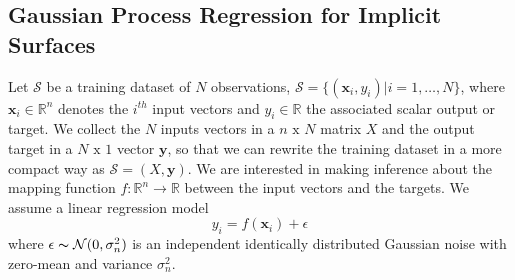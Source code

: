 %
%
%
%

\subsection{Gaussian Process Regression for Implicit Surfaces}
\label{sec:gpr}

Let $\mathcal{S}$ be a training dataset of $N$ observations, $\mathcal{S}=\{(\mathbf{x}_i, y_i)|i=1,\dots,N\}$, where $\mathbf{x}_i\in\mathbb{R}^n$ denotes the $i^{th}$ input vectors and $y_i\in\mathbb{R}$ the associated scalar output or target.  We collect the $N$ inputs vectors in a $n\text{ x }N$ matrix $X$ and the output target in a $N\text{ x }1$ vector $\mathbf{y}$, so that we can rewrite the training dataset in a more compact way as $\mathcal{S}=(X,\mathbf{y})$. We are interested in making inference about the mapping function $f:\mathbb{R}^n\rightarrow\mathbb{R}$ between the input vectors and the targets. We assume a linear regression model
$$
y_i=f(\mathbf{x}_i)+\epsilon
$$
where $\epsilon\thicksim\mathcal{N}(0,\sigma_n^2)$ is an independent identically distributed Gaussian noise with zero-mean and variance $\sigma_n^2$. 


